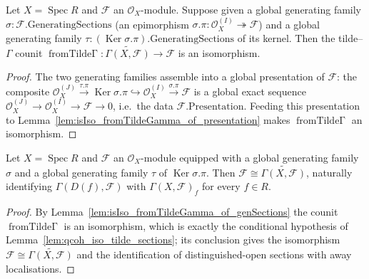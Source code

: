 \begin{lemma}\leanok
  \label{lem:isIso_fromTildeGamma_of_genSections}
  Let \(X = \operatorname{Spec} R\) and \(\mathcal{F}\) an \(\mathcal{O}_X\)-module.
  Suppose given a global generating family
  \(\sigma : \mathcal{F}.\mathrm{GeneratingSections}\) (an epimorphism
  \(\sigma.\pi : \mathcal{O}_X^{(I)} \twoheadrightarrow \mathcal{F}\)) and a global
  generating family \(\tau : (\operatorname{Ker} \sigma.\pi).\mathrm{GeneratingSections}\)
  of its kernel. Then the tilde--\(\Gamma\) counit
  \(\operatorname{fromTilde\Gamma} : \widetilde{\Gamma(X, \mathcal{F})} \to \mathcal{F}\)
  is an isomorphism.
\end{lemma}
\begin{proof}
  \leanok
  The two generating families assemble into a global presentation of \(\mathcal{F}\): the
  composite \(\mathcal{O}_X^{(J)} \xrightarrow{\tau.\pi} \operatorname{Ker} \sigma.\pi
  \hookrightarrow \mathcal{O}_X^{(I)} \xrightarrow{\sigma.\pi} \mathcal{F}\) is a global
  exact sequence \(\mathcal{O}_X^{(J)} \to \mathcal{O}_X^{(I)} \to \mathcal{F} \to 0\),
  i.e.\ the data \(\mathcal{F}.\mathrm{Presentation}\). Feeding this presentation to
  Lemma~\ref{lem:isIso_fromTildeGamma_of_presentation} makes
  \(\operatorname{fromTilde\Gamma}\) an isomorphism.
\end{proof}

\begin{lemma}\leanok
  \label{lem:qcoh_iso_tilde_sections_of_genSections}
  Let \(X = \operatorname{Spec} R\) and \(\mathcal{F}\) an \(\mathcal{O}_X\)-module
  equipped with a global generating family \(\sigma\) and a global generating family
  \(\tau\) of \(\operatorname{Ker} \sigma.\pi\). Then \(\mathcal{F} \cong
  \widetilde{\Gamma(X, \mathcal{F})}\), naturally identifying
  \(\Gamma(D(f), \mathcal{F})\) with \(\Gamma(X, \mathcal{F})_f\) for every \(f \in R\).
\end{lemma}
\begin{proof}
  \leanok
  By Lemma~\ref{lem:isIso_fromTildeGamma_of_genSections} the counit
  \(\operatorname{fromTilde\Gamma}\) is an isomorphism, which is exactly the conditional
  hypothesis of Lemma~\ref{lem:qcoh_iso_tilde_sections}; its conclusion gives the
  isomorphism \(\mathcal{F} \cong \widetilde{\Gamma(X, \mathcal{F})}\) and the
  identification of distinguished-open sections with away localisations.
\end{proof}

